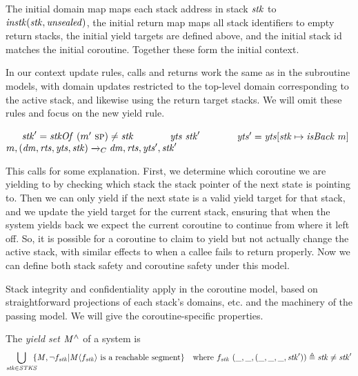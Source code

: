 \documentclass[acmsmall,review,anonymous]{acmart}\settopmatter{printfolios=true,printccs=false,printacmref=false}
\begin{document}
{{The initial domain map maps each stack address in stack \(\mathit{stk}\) to
\(\mathit{instk}(\mathit{stk},\mathit{unsealed})\), the initial return map maps all stack identifiers to empty
return stacks, the initial yield targets are defined above, and the initial stack id matches the initial
coroutine. Together these form the initial context.

In our context update rules, calls and returns work the same as in the subroutine models,
with domain updates restricted to the top-level domain corresponding to the active stack,
and likewise using the return target stacks. We will omit these rules and focus on the new yield rule.

             {~ ~ \(\mathit{stk}' = \mathit{stkOf} ~ (m'~ \textsc{sp}) \not = \mathit{stk}\) ~ ~}
             {~ ~ \(\mathit{yts} ~ \mathit{stk}'\) ~ ~}
             {~ ~ \(\mathit{yts}' = \mathit{yts}[\mathit{stk} \mapsto \mathit{isBack} ~ m]\)}
             {\(m,(\mathit{dm},\mathit{rts},\mathit{yts},\mathit{stk}) \xrightarrow{}_C \mathit{dm},\mathit{rts},\mathit{yts}',\mathit{stk}'\)}

This calls for some explanation. First, we determine which coroutine we are yielding to by
checking which stack the stack pointer of the next state is pointing to. Then we can only yield
if the next state is a valid yield target for that stack, and we update the yield target for
the current stack, ensuring that when the system yields back we expect the current coroutine
to continue from where it left off. So, it is possible for a coroutine to claim to yield
but not actually change the active stack, with similar effects to when a callee fails
to return properly. Now we can define both stack safety and coroutine safety under this model.

Stack integrity and confidentiality apply in the coroutine model, based on straightforward
projections of each stack's domains, etc. and the machinery of the passing model. We will give
the coroutine-specific properties.

 The \emph{yield set} \(\mathit{M}^\wedge\) of a system is
\[\begin{aligned}
\bigcup_{\mathit{stk} \in \mathit{STKS}} \hspace{-.5em} \{\mathit{M}, \neg f_{\mathit{stk}} | \mathit{M}\langle f_{\mathit{stk}} \rangle
\text{ is a reachable segment}\} \hspace{1em} &
\text{where } f_{\mathit{stk}} ~ (\mbox{\_},\mbox{\_},(\mbox{\_},\mbox{\_},\mbox{\_},\mathit{stk}')) \triangleq \mathit{stk} \not = \mathit{stk}' \\
\end{aligned}\]

}}
\end{document}
